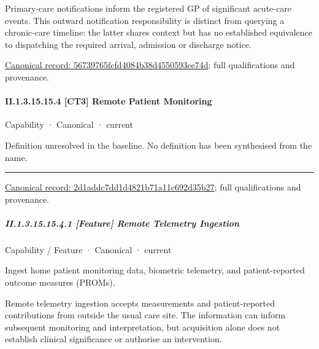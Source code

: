 Primary-care notifications inform the registered GP of significant acute-care events. This outward notification responsibility is distinct from querying a chronic-care timeline: the latter shares context but has no established equivalence to dispatching the required arrival, admission or discharge notice.


{\footnotesize \href{../../../../continuum/strategy/capability/feature/56739765fcfd4084b38d4550593ee74d.md}{Canonical record: 56739765fcfd4084b38d4550593ee74d}; full qualifications and provenance.}\par
\paragraph*{II.1.3.15.15.4 [CT3] Remote Patient Monitoring}
\label{navigation:II.1.3.15.15.4}

\label{element:2d1addc7dd1d4821b71a11c692d35b27}
{\small Capability · Canonical · current}\par

Definition unresolved in the baseline. No definition has been synthesised from the name.



\medskip\hrule\medskip

{\footnotesize \href{../../../../continuum/strategy/capability/2d1addc7dd1d4821b71a11c692d35b27.md}{Canonical record: 2d1addc7dd1d4821b71a11c692d35b27}; full qualifications and provenance.}\par
\subparagraph*{II.1.3.15.15.4.1 [Feature] Remote Telemetry Ingestion}
\label{navigation:II.1.3.15.15.4.1}

\label{element:969dde193fab4c5d82d7dc210c7f5a71}
{\small Capability / Feature · Canonical · current}\par

Ingest home patient monitoring data, biometric telemetry, and patient-reported outcome measures (PROMs).



Remote telemetry ingestion accepts measurements and patient-reported contributions from outside the usual care site. The information can inform subsequent monitoring and interpretation, but acquisition alone does not establish clinical significance or authorise an intervention.


